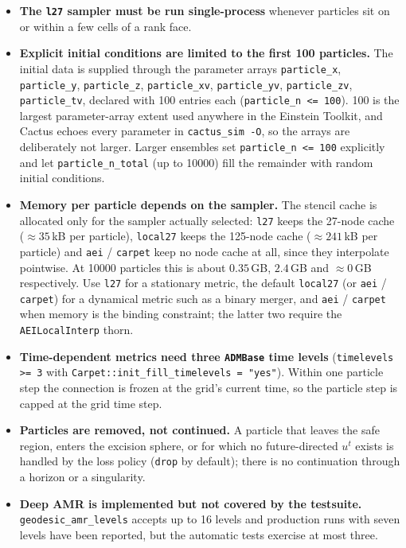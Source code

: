 \documentclass{article}
\begin{document}
\begin{itemize}
  $7.9\times10^{-6}$ after one step).  \texttt{Exact = yes} is
  rank-count independent.  With
  \texttt{Geodesic::step} much larger than the grid step a particle can
  also leave the reachable window of its owner's patch and be dropped by
  the loss policy.  Results that depend on this should be quoted at
  fixed rank count.
\item \textbf{The \texttt{l27} sampler must be run single-process}
  whenever particles sit on or within a few cells of a rank face.
\item \textbf{Explicit initial conditions are limited to the first 100
  particles.}  The initial data is supplied through the parameter arrays
  \texttt{particle\_x}, \texttt{particle\_y}, \texttt{particle\_z},
  \texttt{particle\_xv}, \texttt{particle\_yv}, \texttt{particle\_zv},
  \texttt{particle\_tv}, declared with 100 entries each
  (\texttt{particle\_n <= 100}).  100 is the largest parameter-array
  extent used anywhere in the Einstein Toolkit, and Cactus echoes every
  parameter in \texttt{cactus\_sim -O}, so the arrays are deliberately
  not larger.  Larger ensembles set \texttt{particle\_n <= 100}
  explicitly and let \texttt{particle\_n\_total} (up to 10000) fill the
  remainder with random initial conditions.
\item \textbf{Memory per particle depends on the sampler.}  The
  stencil cache is allocated only for the sampler actually selected:
  \texttt{l27} keeps the 27-node cache ($\approx 35$\,kB per particle),
  \texttt{local27} keeps the 125-node cache ($\approx 241$\,kB per
  particle) and \texttt{aei} / \texttt{carpet} keep no node cache at
  all, since they interpolate pointwise.  At 10000 particles this is
  about $0.35$\,GB, $2.4$\,GB and $\approx 0$\,GB respectively.  Use
  \texttt{l27} for a stationary metric, the default \texttt{local27}
  (or \texttt{aei} / \texttt{carpet}) for a dynamical metric such as a
  binary merger, and \texttt{aei} / \texttt{carpet} when memory is the
  binding constraint; the latter two require the \texttt{AEILocalInterp}
  thorn.
\item \textbf{Time-dependent metrics need three \texttt{ADMBase} time
  levels} (\texttt{timelevels >= 3} with
  \texttt{Carpet::init\_fill\_timelevels = "yes"}).  Within one particle
  step the connection is frozen at the grid's current time, so the
  particle step is capped at the grid time step.
\item \textbf{Particles are removed, not continued.}  A particle that
  leaves the safe region, enters the excision sphere, or for which no
  future-directed $u^t$ exists is handled by the loss policy
  (\texttt{drop} by default); there is no continuation through a
  horizon or a singularity.
\item \textbf{Deep AMR is implemented but not covered by the
  testsuite.}  \texttt{geodesic\_amr\_levels} accepts up to 16 levels
  and production runs with seven levels have been reported, but the
  automatic tests exercise at most three.
\end{itemize}

\end{document}
